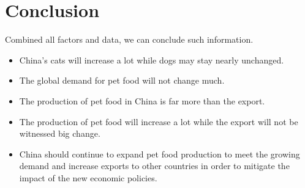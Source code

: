 \documentclass[withoutpreface,bwprint]{cumcmthesis} %
\begin{document}
\section{Conclusion}
\par Combined all factors and data, we can conclude such information.
\begin{itemize}
    \item China's cats will increase a lot while dogs may stay nearly unchanged.
    \item The global demand for pet food will not change much.
    \item The production of pet food in China is far more than the export.
    \item The production of pet food will increase a lot while the export will not be witnessed big change.
    \item China should continue to expand pet food production to meet the growing demand and increase exports to other countries in order to mitigate the impact of the new economic policies.
\end{itemize}
\clearpage






\end{document}
